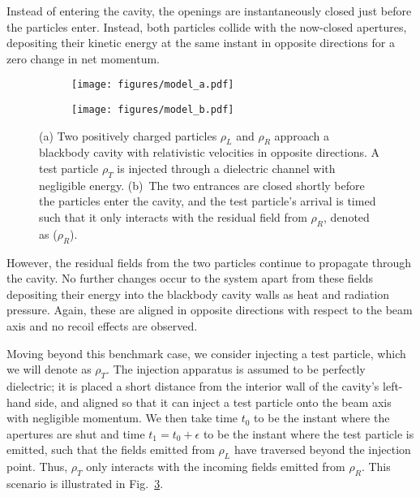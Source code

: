 \documentclass[reprint,
               amsmath,amssymb,nofootinbib, aps%
              ]{revtex4-2}
\begin{document}
Instead of entering the cavity, the openings are instantaneously closed just before the particles enter. Instead, both particles collide with the now-closed apertures, depositing their kinetic energy at the same instant in opposite directions for a zero change in net momentum.

\begin{figure}
  \begin{subfigure}{\columnwidth}
    \centering
    \texttt{[image: figures/model\_a.pdf]}
    \caption{}
    \label{fig:model_setup}
  \end{subfigure}
  
  \begin{subfigure}{\columnwidth}
    \centering
    \texttt{[image: figures/model\_b.pdf]}
    \caption{}
    \label{fig:model_residuals}
  \end{subfigure}
  \vspace{-1\baselineskip}
  \caption{(a) Two positively charged particles $\rho_L$ and  $\rho_R$ approach a blackbody cavity with relativistic velocities in opposite directions. A test particle $\rho_T$ is injected through a dielectric channel with negligible energy. (b)~The two entrances are closed shortly before the particles enter the cavity, and the test particle's arrival is timed such that it only interacts with the residual field from $\rho_R$, denoted as ($\rho_R$).}
  \label{fig:model_cavity}
\end{figure}

However, the residual fields from the two particles continue to propagate through the cavity. No further changes occur to the system apart from these fields depositing their energy into the blackbody cavity walls as heat and radiation pressure. Again, these are aligned in opposite directions with respect to the beam axis and no recoil effects are observed. 

Moving beyond this benchmark case, we consider injecting a test particle, which we will denote as $\rho_{T}$. The injection apparatus is assumed to be perfectly dielectric; it is placed a short distance from the interior wall of the cavity's left-hand side, and aligned so that it can inject a test particle onto the beam axis with negligible momentum. We then take time $t_0$ to be the instant where the apertures are shut and time $t_1=t_0+\epsilon$ to be the instant where the test particle is emitted, such that the fields emitted from $\rho_L$ have traversed beyond the injection point. Thus, $\rho_T$ only interacts with the incoming fields emitted from $\rho_R$. This scenario is illustrated in Fig.~\ref{fig:model_cavity}.
\end{document}
